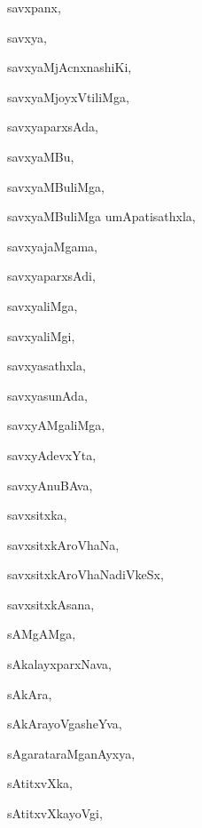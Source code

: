 \begin{multicols}{3}
{\noindent
{savxpanx}, \pageref{savxpanx}

\noindent
{savxya}, \pageref{savxya}

\noindent
{savxyaMjAcnxnashiKi}, \pageref{savxyaMjAcnxnashiKi}

\noindent
{savxyaMjoyxVtiliMga}, \pageref{savxyaMjoyxVtiliMga}

\noindent
{savxyaparxsAda}, \pageref{savxyaparxsAda}

\noindent
{savxyaMBu}, \pageref{savxyaMBu}

\noindent
{savxyaMBuliMga}, \pageref{savxyaMBuliMga}

\noindent
{savxyaMBuliMga umApatisathxla}, \pageref{savxyaMBuliMgaumApatisathxla}

\noindent
{savxyajaMgama}, \pageref{savxyajaMgama}

\noindent
{savxyaparxsAdi}, \pageref{savxyaparxsAdi}

\noindent
{savxyaliMga}, \pageref{savxyaliMga}

\noindent
{savxyaliMgi}, \pageref{savxyaliMgi}

\noindent
{savxyasathxla}, \pageref{savxyasathxla}

\noindent
{savxyasunAda}, \pageref{savxyasunAda}

\noindent
{savxyAMgaliMga}, \pageref{savxyAMgaliMga}

\noindent
{savxyAdevxYta}, \pageref{savxyAdevxYta}

\noindent
{savxyAnuBAva}, \pageref{savxyAnuBAva}

\noindent
{savxsitxka}, \pageref{savxsitxka}

\noindent
{savxsitxkAroVhaNa}, \pageref{savxsitxkAroVhaNa}

\noindent
{savxsitxkAroVhaNadiVkeSx}, \pageref{savxsitxkAroVhaNadiVkeSx}

\noindent
{savxsitxkAsana}, \pageref{savxsitxkAsana}

\noindent
{sAMgAMga}, \pageref{sAMgAMga}

\noindent
{sAkalayxparxNava}, \pageref{sAkalayxparxNava}

\noindent
{sAkAra}, \pageref{sAkAra}

\noindent
{sAkArayoVgasheYva}, \pageref{sAkArayoVgasheYva}

\noindent
{sAgarataraMganAyxya}, \pageref{sAgarataraMganAyxya}

\noindent
{sAtitxvXka}, \pageref{sAtitxvXka}

\noindent
{sAtitxvXkayoVgi}, \pageref{sAtitxvXkayoVgi}

}
\end{multicols}
